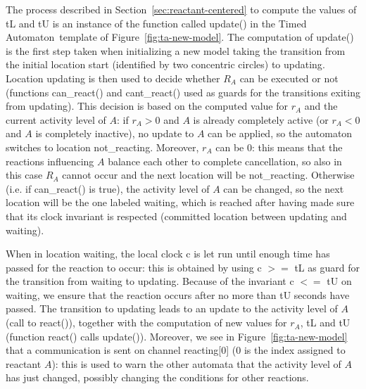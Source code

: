 \documentclass{llncs}
\newcommand{\ta}{Timed Automaton}
\begin{document}
The process described in Section~\ref{sec:reactant-centered} to compute the values of {\sf tL} and {\sf tU} is an instance of the function called {\sf update()}
in the \ta\ template of Figure~\ref{fig:ta-new-model}. The computation of {\sf update()} is the first step
taken when initializing a new model taking the transition from the initial location {\sf start} (identified by two concentric circles)
to {\sf updating}.
Location {\sf updating} is then used to decide whether $R_A$ can be executed or not (functions
{\sf can\_react()} and {\sf cant\_react()} used as guards for the transitions exiting from {\sf updating}).
This decision is based on the computed value for
$r_A$ and the current activity level of $A$: if $r_A > 0$ and $A$ is already completely active
(or  $r_A < 0$ and $A$ is completely inactive), no
update to $A$ can be applied, so the automaton switches to location {\sf not\_reacting}.
Moreover, $r_A$ can be $0$: this means
that the reactions influencing $A$ balance each other to complete cancellation, so also in this
case $R_A$ cannot occur and the next location will be {\sf not\_reacting}. Otherwise (i.e. if {\sf can\_react()} is true), the activity
level of $A$ can be changed, so the next location will be the one labeled {\sf waiting}, which
is reached after having made sure that its clock invariant is respected (committed location
between {\sf updating} and {\sf waiting}).

When in location {\sf waiting}, the local clock {\sf c}
is let run until enough time has passed for the reaction to occur: this is obtained by using {\sf c $>=$ tL} as guard
for the transition from {\sf waiting} to {\sf updating}.
Because of the invariant {\sf c $<=$ tU} on {\sf waiting}, we ensure that the reaction occurs after no more than {\sf tU} seconds have passed.
The transition to {\sf updating} leads to an update to the activity level of $A$ (call to {\sf react()}), together with the computation of new values for $r_A$,
{\sf tL} and {\sf tU} (function {\sf react()} calls {\sf update()}). Moreover, we see in Figure~\ref{fig:ta-new-model}
that a communication is sent on channel {\sf reacting[0]} ($0$ is the index
assigned to reactant $A$): this is used to warn
the other automata that the activity level of $A$ has just changed, possibly changing the conditions for
other reactions.
\end{document}
